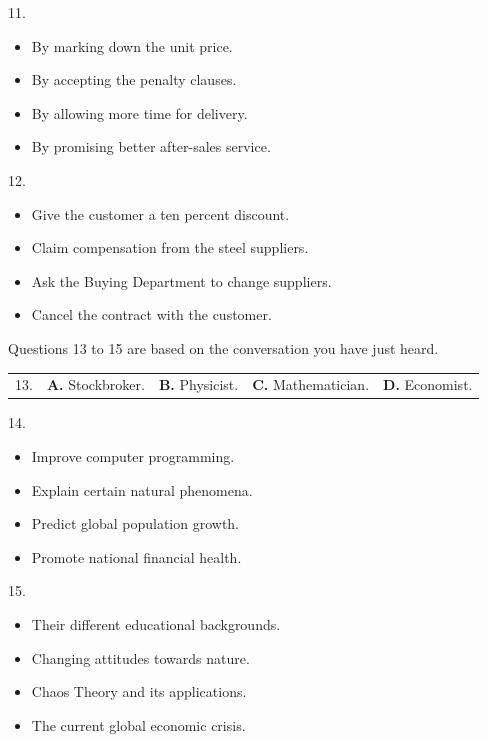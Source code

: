 \documentclass[UTF8,11pt]{ctexart}
\begin{document}
11.


\begin{itemize}[leftmargin=2em,itemsep=.2em,topsep=.4em]\item[A.] By marking down the unit price.
\item[B.] By accepting the penalty clauses.
\item[C.] By allowing more time for delivery.
\item[D.] By promising better after-sales service.
\end{itemize}

12.


\begin{itemize}[leftmargin=2em,itemsep=.2em,topsep=.4em]\item[A.] Give the customer a ten percent discount.
\item[B.] Claim compensation from the steel suppliers.
\item[C.] Ask the Buying Department to change suppliers.
\item[D.] Cancel the contract with the customer.
\end{itemize}

Questions 13 to 15 are based on the conversation you have just heard.


\noindent\begin{tabularx}{\linewidth}{@{}lXXXX@{}}13. & \textbf{A.} Stockbroker. & \textbf{B.} Physicist. & \textbf{C.} Mathematician. & \textbf{D.} Economist.\\\end{tabularx}\par

14.


\begin{itemize}[leftmargin=2em,itemsep=.2em,topsep=.4em]\item[A.] Improve computer programming.
\item[B.] Explain certain natural phenomena.
\item[C.] Predict global population growth.
\item[D.] Promote national financial health.
\end{itemize}

15.


\begin{itemize}[leftmargin=2em,itemsep=.2em,topsep=.4em]\item[A.] Their different educational backgrounds.
\item[B.] Changing attitudes towards nature.
\item[C.] Chaos Theory and its applications.
\item[D.] The current global economic crisis.
\end{itemize}
\end{document}
